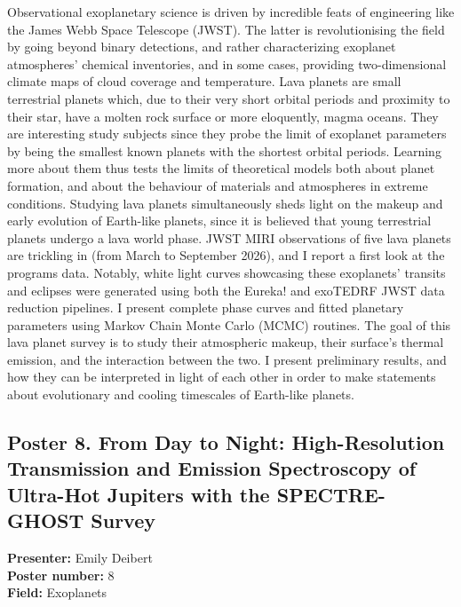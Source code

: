Observational exoplanetary science is driven by incredible feats of engineering like the James Webb Space Telescope (JWST). The latter is revolutionising the field by going beyond binary detections, and rather characterizing exoplanet atmospheres' chemical inventories, and in some cases, providing two-dimensional climate maps of cloud coverage and temperature. Lava planets are small terrestrial planets which, due to their very short orbital periods and proximity to their star, have a molten rock surface or more eloquently, magma oceans. They are interesting study subjects since they probe the limit of exoplanet parameters by being the smallest known planets with the shortest orbital periods. Learning more about them thus tests the limits of theoretical models both about planet formation, and about the behaviour of materials and atmospheres in extreme conditions. Studying lava planets simultaneously sheds light on the makeup and early evolution of Earth-like planets, since it is believed that young terrestrial planets undergo a lava world phase. JWST MIRI observations of five lava planets are trickling in (from March to September 2026), and I report a first look at the programs data. Notably, white light curves showcasing these exoplanets' transits and eclipses were generated using both the Eureka! and exoTEDRF JWST data reduction pipelines. I present complete phase curves and fitted planetary parameters using Markov Chain Monte Carlo (MCMC) routines. The goal of this lava planet survey is to study their atmospheric makeup, their surface's thermal emission, and the interaction between the two. I present preliminary results, and how they can be interpreted in light of each other in order to make statements about evolutionary and cooling timescales of Earth-like planets.

\hypertarget{poster-abstract-talk-32}{}\label{poster-abstract-page-talk-32}
\subsection*{Poster 8. From Day to Night: High-Resolution Transmission and Emission Spectroscopy of Ultra-Hot Jupiters with the SPECTRE-GHOST Survey}
\textbf{Presenter:} Emily Deibert\\
\textbf{Poster number:} 8\\
\textbf{Field:} Exoplanets

